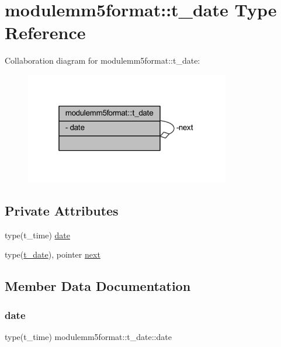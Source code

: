 \hypertarget{structmodulemm5format_1_1t__date}{}\section{modulemm5format\+:\+:t\+\_\+date Type Reference}
\label{structmodulemm5format_1_1t__date}


Collaboration diagram for modulemm5format\+:\+:t\+\_\+date\+:\nopagebreak
\begin{figure}[H]
\begin{center}
\leavevmode
\includegraphics[width=253pt]{structmodulemm5format_1_1t__date__coll__graph}
\end{center}
\end{figure}
\subsection*{Private Attributes}
\begin{DoxyCompactItemize}
\item 
type(t\+\_\+time) \mbox{\hyperlink{structmodulemm5format_1_1t__date_a05d510586d192a355f68a7d7dc597443}{date}}
\item 
type(\mbox{\hyperlink{structmodulemm5format_1_1t__date}{t\+\_\+date}}), pointer \mbox{\hyperlink{structmodulemm5format_1_1t__date_a4b9ba6e912c01a4a38612cc74388bd3a}{next}}
\end{DoxyCompactItemize}


\subsection{Member Data Documentation}
\mbox{\label{structmodulemm5format_1_1t__date_a05d510586d192a355f68a7d7dc597443}} 
\subsubsection{\texorpdfstring{date}{date}}
{\footnotesize\ttfamily type(t\+\_\+time) modulemm5format\+::t\+\_\+date\+::date\hspace{0.3cm}{\ttfamily [private]}}


